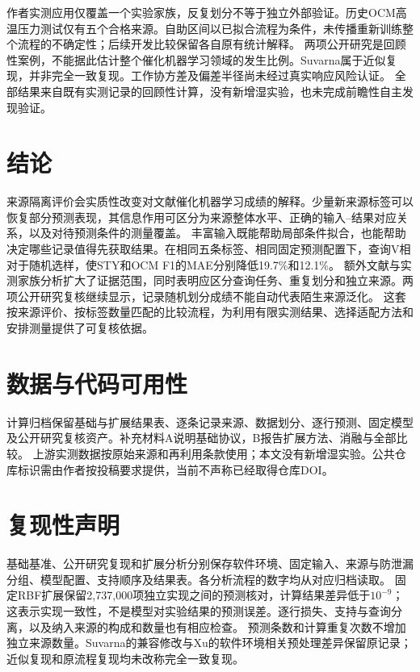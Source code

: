 \documentclass[11pt,a4paper]{article}
\begin{document}
作者实测应用仅覆盖一个实验家族，反复划分不等于独立外部验证。历史OCM高温压力测试仅有五个合格来源。自助区间以已拟合流程为条件，未传播重新训练整个流程的不确定性；后续开发比较保留各自原有统计解释。
两项公开研究是回顾性案例，不能据此估计整个催化机器学习领域的发生比例。Suvarna属于近似复现，并非完全一致复现。工作协方差及偏差半径尚未经过真实响应风险认证。
全部结果来自既有实测记录的回顾性计算，没有新增湿实验，也未完成前瞻性自主发现验证。

\section{结论}
来源隔离评价会实质性改变对文献催化机器学习成绩的解释。少量新来源标签可以恢复部分预测表现，其信息作用可区分为来源整体水平、正确的输入--结果对应关系，以及对待预测条件的测量覆盖。
丰富输入既能帮助局部条件拟合，也能帮助决定哪些记录值得先获取结果。在相同五条标签、相同固定预测配置下，查询V相对于随机选样，使STY和OCM F1的MAE分别降低19.7\%和12.1\%。
额外文献与实测家族分析扩大了证据范围，同时表明应区分查询任务、重复划分和独立来源。两项公开研究复核继续显示，记录随机划分成绩不能自动代表陌生来源泛化。
这套按来源评价、按标签数量匹配的比较流程，为利用有限实测结果、选择适配方法和安排测量提供了可复核依据。

\section*{数据与代码可用性}
计算归档保留基础与扩展结果表、逐条记录来源、数据划分、逐行预测、固定模型及公开研究复核资产。补充材料A说明基础协议，B报告扩展方法、消融与全部比较。
上游实测数据按原始来源和再利用条款使用；本文没有新增湿实验。公共仓库标识需由作者按投稿要求提供，当前不声称已经取得仓库DOI。

\section*{复现性声明}
基础基准、公开研究复现和扩展分析分别保存软件环境、固定输入、来源与防泄漏分组、模型配置、支持顺序及结果表。各分析流程的数字均从对应归档读取。
固定RBF扩展保留2,737,000项独立实现之间的预测核对，计算结果差异低于$10^{-9}$；这表示实现一致性，不是模型对实验结果的预测误差。逐行损失、支持与查询分离，以及纳入来源的构成和数量也有相应检查。
预测条数和计算重复次数不增加独立来源数量。Suvarna的兼容修改与Xu的软件环境相关预处理差异保留原记录；近似复现和原流程复现均未改称完全一致复现。


\end{document}
